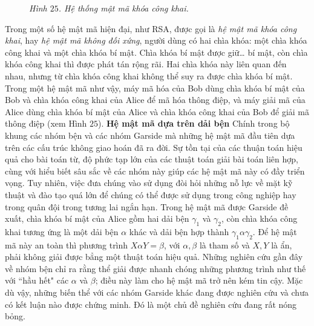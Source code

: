\begin{multicols}{2}
\begin{figure}[H]
		\caption{\small\textit{\color{duongvaotoanhoc}Hình $25$. Hệ thống mật mã khóa công khai.}}
		\vspace*{-5pt}
	\end{figure}
	Trong một số hệ mật mã hiện đại, như RSA, được gọi là \textit{hệ mật mã khóa công khai}, hay \textit{hệ mật mã không đối xứng}, người dùng có hai chìa khóa: một chìa khóa công khai và một chìa khóa bí mật. Chìa khóa bí mật được giữ… bí mật, còn chìa khóa công khai thì được phát tán rộng rãi. Hai chìa khóa này liên quan đến nhau, nhưng từ chìa khóa công khai không thể suy ra được chìa khóa bí mật. Trong một hệ mật mã như vậy, máy mã hóa của Bob dùng chìa khóa bí mật của Bob và chìa khóa công khai của Alice để mã hóa thông điệp, và máy giải mã của Alice dùng chìa khóa bí mật của Alice và chìa khóa công khai của Bob để giải mã thông điệp (xem Hình $25$).
	\vskip 0.05cm
	\textbf{\color{duongvaotoanhoc}Hệ mật mã dựa trên dải bện}
	\vskip 0.05cm
	Chính trong bộ khung các nhóm bện và các nhóm Garside mà những hệ mật mã đầu tiên dựa trên các cấu trúc không giao hoán đã ra đời. Sự tồn tại của các thuận toán hiệu quả cho bài toán từ, độ phức tạp lớn của các thuật toán giải bài toán liên hợp, cùng với hiểu biết sâu sắc về các nhóm này giúp các hệ mật mã này có đầy triển vọng. Tuy nhiên, việc đưa chúng vào sử dụng đòi hỏi những nỗ lực về mặt kỹ thuật và đào tạo quá lớn để chúng có thể được sử dụng trong công nghiệp hay trong quân đội trong tương lai ngắn hạn.
	\vskip 0.1cm
	Trong hệ mật mã được Garside đề xuất, chìa khóa bí mật của Alice gồm hai dải bện $\gamma_1$ và $\gamma_2$, còn chìa khóa công khai tương ứng là một dải bện $\alpha$ khác và dải bện hợp thành $\gamma_1 \alpha \gamma_2$. Để hệ mật mã này an toàn thì phương trình $X \alpha Y = \beta$, với $\alpha, \beta$ là tham số và $X, Y$ là ẩn, phải không giải được bẳng một thuật toán hiệu quả. Những nghiên cứu gần đây về nhóm bện chỉ ra rằng thể giải được nhanh chóng những phương trình như thế với ``hầu hết" các $\alpha$ và $\beta$; điều này làm cho hệ mật mã trở nên kém tin cậy. Mặc dù vậy, những biến thể với các nhóm Garside khác đang được nghiên cứu và chưa có kết luận nào được chứng minh. Đó là một chủ đề nghiên cứu đang rất nóng bỏng.
\end{multicols}